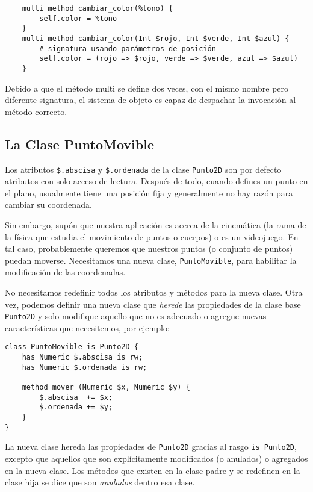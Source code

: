 \begin{verbatim}
    multi method cambiar_color(%tono) {
        self.color = %tono
    }
    multi method cambiar_color(Int $rojo, Int $verde, Int $azul) {
        # signatura usando parámetros de posición
        self.color = (rojo => $rojo, verde => $verde, azul => $azul)
    }
\end{verbatim} 

Debido a que el método multi se define dos veces, con el 
mismo nombre pero diferente signatura, el sistema de objeto
es capaz de despachar la invocación al método correcto.


\subsection{La Clase PuntoMovible}

Los atributos \verb|$.abscisa| y \verb|$.ordenada| de la 
clase {\tt Punto2D} son por defecto atributos con solo
acceso de lectura. Después de todo, cuando defines un punto
en el plano, usualmente tiene una posición fija y generalmente 
no hay razón para cambiar su coordenada.

Sin embargo, supón que nuestra aplicación es acerca de la
cinemática (la rama de la física que estudia el movimiento
de puntos o cuerpos) o es un videojuego. En tal caso, probablemente
queremos que nuestros puntos (o conjunto de puntos) puedan 
moverse. Necesitamos una nueva clase, {\tt PuntoMovible},
para habilitar la modificación de las coordenadas.

No necesitamos redefinir todos los atributos y métodos para
la nueva clase. Otra vez, podemos definir una nueva clase
que \emph{herede} las propiedades de la clase base {\tt Punto2D}
y solo modifique aquello que no es adecuado o agregue 
nuevas características que necesitemos, por ejemplo:

\begin{verbatim}
class PuntoMovible is Punto2D {
    has Numeric $.abscisa is rw;
    has Numeric $.ordenada is rw;
    
    method mover (Numeric $x, Numeric $y) {
        $.abscisa  += $x;
        $.ordenada += $y;
    }
}
\end{verbatim}

La nueva clase hereda las propiedades de {\tt Punto2D} 
gracias al rasgo {\tt is Punto2D}, excepto que aquellos
que son explícitamente modificados (o anulados) o agregados
en la nueva clase. Los métodos que existen en la clase padre
y se redefinen en la clase hija se dice que son \emph{anulados}
dentro esa clase.

